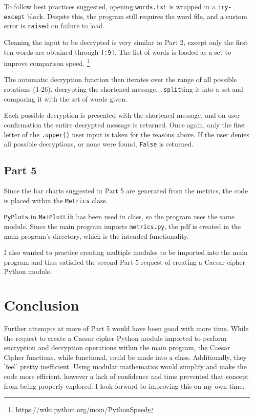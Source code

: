 \documentclass{article}
\begin{document}
To follow best practices suggested, opening \texttt{words.txt} is wrapped in a \texttt{try-except} block. Despite this, the program still requires the word file, and a custom error is \texttt{raise}d on failure to load.

Cleaning the input to be decrypted is very similar to Part 2, except only the first ten words are obtained through \texttt{[:9]}. The list of words is loaded as a set to improve comparison speed. \footnote{https://wiki.python.org/moin/PythonSpeed}

The automatic decryption function then iterates over the range of all possible rotations (1-26), decrypting the shortened message, \texttt{.split}ting it into a set and comparing it with the set of words given.

Each possible decryption is presented with the shortened message, and on user confirmation the entire decrypted message is returned. Once again, only the first letter of the \texttt{.upper()} user input is taken for the reasons above. If the user denies all possible decryptions, or none were found, \texttt{False} is returned.

\subsection{Part 5}
Since the bar charts suggested in Part 5 are generated from the metrics, the code is placed within the \texttt{Metrics} class.

\texttt{PyPlots} in \texttt{MatPlotLib} has been used in class, so the program uses the same module. Since the main program imports \texttt{metrics.py}, the pdf is created in the main program's directory, which is the intended functionality.

I also wanted to practice creating multiple modules to be imported into the main program and thus satisfied the second Part 5 request of creating a Caesar cipher Python module.

\section{Conclusion}

Further attempts at more of Part 5 would have been good with more time. While the request to create a Caesar cipher Python module imported to perform encryption and decryption operations within the main program, the Caesar Cipher functions, while functional, could be made into a class. Additionally, they 'feel' pretty inefficient. Using modular mathematics would simplify and make the code more efficient, however a lack of confidence and time prevented that concept from being properly explored.
I look forward to improving this on my own time.
\end{document}
